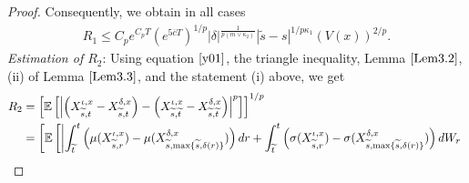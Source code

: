 \documentclass[11pt]{article}
\theoremstyle{theorem}
\theoremstyle{definition}
\newcommand{\1}{{\bf 1}}
\begin{document}
\begin{proof}
Consequently, we obtain in all cases
 \begin{align} R_1 \leq C_p e^{C_p T}  (e^{5\overline{c}T})^{1/p} |\delta|^{\frac{1}{p(m \vee \kappa_2)}} |\widetilde{s}-s|^{1/p\kappa_1}  (V(x))^{2/p}.
 \label{R1}
 \end{align} 
{\it Estimation of  $R_2$}: 
Using equation $\eqref{y01}$, the triangle inequality, Lemma $\ref{Lem3.2}$, (ii) of Lemma $\ref{Lem3.3}$, and the statement (i) above,
 we get
\begin{align}
R_2& = \left[\mathbb{E}\left[\left|\left(X^{\iota, x}_{\widetilde{s},t}-X^{\delta,x}_{\widetilde{s},t}\right) - \left(X^{\iota, x}_{\widetilde{s},\widetilde{t}}-X^{\delta, x}_{\widetilde{s},\widetilde{t}}\right)\right|^p\right]\right]^{1/p} \notag\\
& = \left[\mathbb{E}\left[ \left|\int^t_{\widetilde{t}}  \left( \mu(X_{\widetilde{s}, r}^{\iota, x})-\mu(X_{\widetilde{s}, \max \{\widetilde{s}, \delta(r) \}}^{\delta, x}) \right) dr + \int^t_{\widetilde{t}} \left( \sigma(X_{\widetilde{s}, r}^{\iota, x}) -\sigma(X_{\widetilde{s}, \max \{\widetilde{s}, \delta(r) \}}^{\delta, x})\right) dW_r \right. \right. \right. \notag\\

\end{align}
\end{proof}
\end{document}
